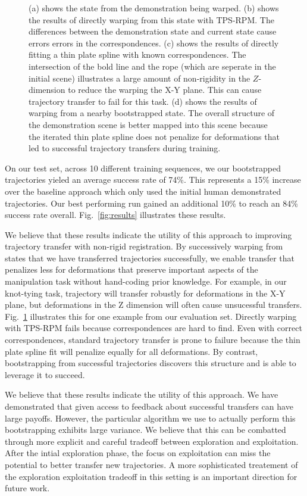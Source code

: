 \begin{figure}
{  (a) shows the state from the demonstration being warped. (b) shows the results of directly warping from this state with TPS-RPM. The differences between the demonstration state and current state cause errors errors in the correspondences. (c) shows the results of directly fitting a thin plate spline with known correspondences. The intersection of the bold line and the rope (which are seperate in the initial scene) illustrates a large amount of non-rigidity in the $Z$-dimension to reduce the warping the X-Y plane. This can cause trajectory transfer to fail for this task. (d) shows the results of warping from a nearby bootstrapped state. The overall structure of the demonstration scene is better mapped into this scene because the iterated thin plate spline does not penalize for deformations that led to successful trajectory transfers during training.}
  \label{fig:warps}
\end{figure}



On our test set, across 10 different training sequences, we our bootstrapped trajectories
yieled an average success rate of 74\%. This represents a 15\% increase over the baseline 
approach which only used the initial human demonstrated trajectories. Our best performing
run gained an additional 10\% to reach an 84\% success rate overall. Fig.~\ref{fig:results} 
illustrates these results.

We believe that these results indicate the utility of this approach to improving
trajectory transfer with non-rigid registration. By successively warping from 
states that we have transferred trajectories successfully, we enable transfer
that penalizes less for deformations that preserve important aspects of the manipulation
task without hand-coding prior knowledge. For example, in our knot-tying task, trajectory 
will transfer robustly for deformations in the X-Y plane, but deformations in the Z dimension
will often cause unsucessful transfers. Fig.~\ref{fig:warps} illustrates this for one
example from our evaluation set. Directly warping with TPS-RPM fails because correspondences 
are hard to find. Even with correct correspondences, standard trajectory transfer is
prone to failure because the thin plate spline fit will penalize equally for all deformations.
By contrast, bootstrapping from successful trajectories discovers this structure
and is able to leverage it to succeed. 

We believe that these results indicate the utility of this approach. We have demonstrated that
given access to feedback about successful transfers can have large payoffs. However,
the particular algorithm we use to actually perform this bootstrapping exhibits large variance.
We believe that this can be combatted through more explicit and careful tradeoff between
exploration and exploitation. After the intial exploration phase, the focus on exploitation
can miss the potential to better transfer new trajectories. A more sophisticated treatement
of the exploration exploitation tradeoff in this setting is an important direction for future work.


